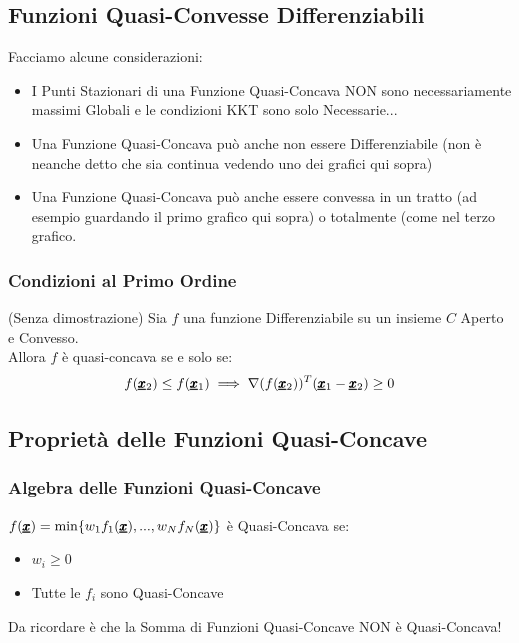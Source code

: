 \subsection{Funzioni Quasi-Convesse Differenziabili}
Facciamo alcune considerazioni:
\begin{itemize}
    \item I Punti Stazionari di una Funzione Quasi-Concava NON sono necessariamente massimi Globali e le condizioni KKT sono solo Necessarie...
    \item Una Funzione Quasi-Concava può anche non essere Differenziabile (non è neanche detto che sia continua vedendo uno dei grafici qui sopra)
    \item Una Funzione Quasi-Concava può anche essere convessa in un tratto (ad esempio guardando il primo grafico qui sopra) o totalmente (come nel terzo grafico.
\end{itemize}

\subsubsection{Condizioni al Primo Ordine}
(Senza dimostrazione)
Sia $f$ una funzione Differenziabile su un insieme $C$ Aperto e Convesso.\\
Allora $f$ è quasi-concava se e solo se:
\begin{equation*}
    f(\pmb{\underline{x}}_2) \leq f(\pmb{\underline{x}}_1) \implies \nabla(f(\pmb{\underline{x}}_2))^T (\pmb{\underline{x}}_1 - \pmb{\underline{x}}_2) \geq 0
\end{equation*}

\subsection{Proprietà delle Funzioni Quasi-Concave}
\subsubsection{Algebra delle Funzioni Quasi-Concave}
$f(\pmb{\underline{x}}) = \min\{w_1 f_1(\pmb{\underline{x}}),..., w_N f_N(\pmb{\underline{x}})\}$ è Quasi-Concava se:
\begin{itemize}
    \item $w_i \geq 0$
    \item Tutte le $f_i$ sono Quasi-Concave
\end{itemize}

Da ricordare è che la Somma di Funzioni Quasi-Concave NON è Quasi-Concava!



